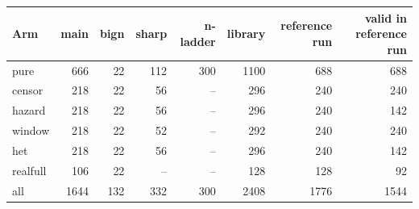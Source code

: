 \begin{tabular}{lrrrrrrr}
\toprule
Arm & main & bign & sharp & n-ladder & library & reference run & valid in reference run \\
\midrule
pure & 666 & 22 & 112 & 300 & 1100 & 688 & 688 \\
censor & 218 & 22 & 56 & -- & 296 & 240 & 240 \\
hazard & 218 & 22 & 56 & -- & 296 & 240 & 142 \\
window & 218 & 22 & 52 & -- & 292 & 240 & 240 \\
het & 218 & 22 & 56 & -- & 296 & 240 & 142 \\
realfull & 106 & 22 & -- & -- & 128 & 128 & 92 \\
\midrule
all & 1644 & 132 & 332 & 300 & 2408 & 1776 & 1544 \\
\bottomrule
\end{tabular}
